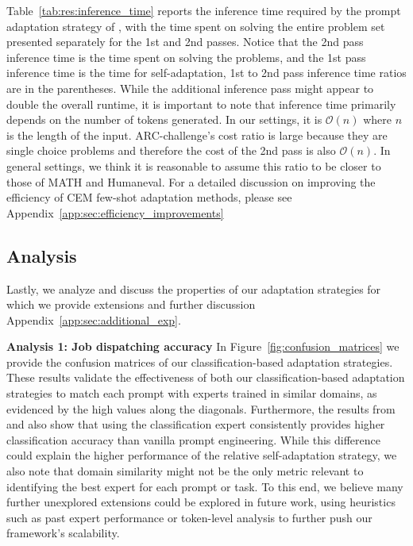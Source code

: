 Table~\ref{tab:res:inference_time} reports the inference time required by the prompt adaptation strategy of \implname, with the time spent on solving the entire problem set presented separately for the 1st and 2nd passes.
Notice that the 2nd pass inference time is the time spent on solving the problems, and the 1st pass inference time is the time for self-adaptation, 1st to 2nd pass inference time ratios are in the parentheses.
While the additional inference pass might appear to double the overall runtime, it is important to note that inference time primarily depends on the number of tokens generated.
In our settings, it is $\mathcal{O}(n)$ where $n$ is the length of the input.
ARC-challenge's cost ratio is large because they are single choice problems and therefore the cost of the 2nd pass is also $\mathcal{O}(n)$.
In general settings, we think it is reasonable to assume this ratio to be closer to those of MATH and Humaneval.
For a detailed discussion on improving the efficiency of CEM few-shot adaptation methods, please see Appendix~\ref{app:sec:efficiency_improvements}

\subsection{Analysis}
\label{sec:analysis}

Lastly, we analyze and discuss the properties of our adaptation strategies for which we provide extensions and further discussion Appendix~\ref{app:sec:additional_exp}.

\textbf{Analysis 1: Job dispatching accuracy}
In Figure~\ref{fig:confusion_matrices} we provide the confusion matrices of our classification-based adaptation strategies. These results validate the effectiveness of both our classification-based adaptation strategies to match each prompt with experts trained in similar domains, as evidenced by the high values along the diagonals. 
Furthermore, the results from \llama and \mistral also show that using the classification expert consistently provides higher classification accuracy than vanilla prompt engineering.
While this difference could explain the higher performance of the relative self-adaptation strategy, we also note that domain similarity might not be the only metric relevant to identifying the best expert for each prompt or task.
To this end, we believe many further unexplored extensions could be explored in future work, using heuristics such as past expert performance or token-level analysis to further push our framework's scalability.

